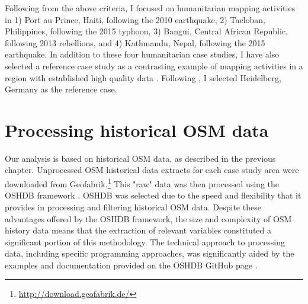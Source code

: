 Following from the above criteria, I focused on humanitarian mapping activities in 1) Port au Prince, Haiti, following the 2010 earthquake, 2) Tacloban, Philippines, following the 2015 typhoon, 3) Bangui, Central African Republic, following 2013 rebellions, and 4) Kathmandu, Nepal, following the 2015 earthquake. In addition to these four humanitarian case studies, I have also selected a reference case study as a contrasting example of mapping activities in a region with established high quality data \parencite{arsanjani_assessing_2013}. Following \textcite{anderson_crowd_2018}, I selected Heidelberg, Germany as the reference case.

\section{Processing historical OSM data}
\label{sec:history}

Our analysis is based on historical OSM data, as described in the previous chapter. Unprocessed OSM historical data extracts for each case study area were downloaded from Geofabrik.\footnote{\url{http://download.geofabrik.de/}} This "raw" data was then processed using the OSHDB framework \parencite{raifer_oshdb_2019}. OSHDB was selected due to the speed and flexibility that it provides in processing and filtering historical OSM data. Despite these advantages offered by the OSHDB framework, the size and complexity of OSM history data means that the extraction of relevant variables constituted a significant portion of this methodology. The technical approach to processing data, including specific programming approaches, was significantly aided by the examples and documentation provided on the OSHDB GitHub page \parencite{heidelberg_institute_for_geoinformation_technology_oshdb_2020}.

